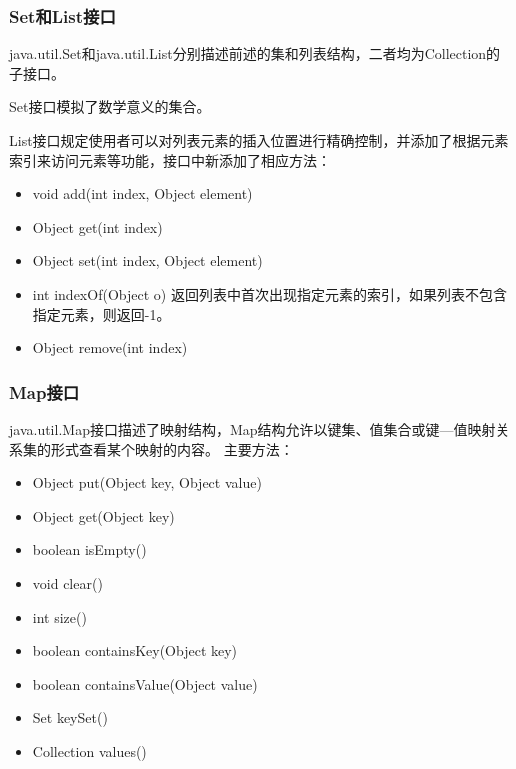 \documentclass[compress,table]{beamer} %
\begin{document}
\begin{frame}[fragile] %
\frametitle{Set和List接口}

java.util.Set和java.util.List分别描述前述的集和列表结构，二者均为Collection的子接口。

Set接口模拟了数学意义的集合。

List接口规定使用者可以对列表元素的插入位置进行精确控制，并添加了根据元素索引来访问元素等功能，接口中新添加了相应方法：

\begin{itemize}[<+-| alert@+>]
\item void add(int index, Object element)
\item Object get(int index)
\item Object set(int index, Object element) 
\item int indexOf(Object o) 返回列表中首次出现指定元素的索引，如果列表不包含指定元素，则返回-1。
\item Object remove(int index)
\end{itemize}
\end{frame}

\begin{frame}[fragile] %
\frametitle{Map接口}

java.util.Map接口描述了映射结构，Map结构允许以键集、值集合或键—值映射关系集的形式查看某个映射的内容。
主要方法：
\begin{itemize}[<+-| alert@+>]
\item Object put(Object key, Object value)\\
\item Object get(Object key)\\
\item boolean isEmpty()
\item void clear()
\item int size()
\item boolean containsKey(Object key)\\
\item boolean containsValue(Object value)
\item Set keySet()\\
\item Collection values()\\
\end{itemize}
\end{frame}
\end{document}
